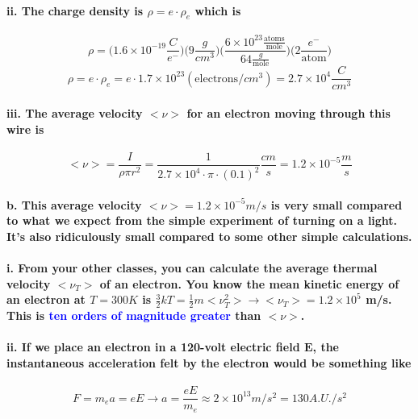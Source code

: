 \documentclass{article}
\begin{document}
\paragraph{\indent\indent ii. The charge density is $\rho=e\cdot\rho_e$ which is}
\begin{equation*}
    \rho=\bigg(1.6\times10^{-19}\frac{C}{e^-}\bigg)\bigg(9\frac{g}{cm^3}\bigg)\bigg(\frac{6\times10^{23}\frac{\text{atoms}}{\text{mole}}}{64\frac{g}{\text{mole}}}\bigg)\bigg(2\frac{e^-}{\text{atom}}\bigg)
\end{equation*}
\begin{equation*}
    \rho=e\cdot\rho_e=e\cdot 1.7\times 10^{23}(\text{electrons/}cm^3)=2.7\times10^4 \frac{C}{cm^3}
\end{equation*}
\paragraph{\indent\indent iii. The average velocity $<\nu>$ for an electron moving through this wire is}
\begin{equation}
    <\nu>=\frac{I}{\rho\pi r^2}=\frac{1}{2.7\times10^4\cdot\pi\cdot (0.1)^2}\frac{cm}{s}=1.2\times10^{-5}\frac{m}{s}
\end{equation}
\paragraph{\indent b. This average velocity $<\nu>=1.2\times10^{-5}m/s$ is very small compared to what we expect from the simple experiment of turning on a light. It's also ridiculously small compared to some other simple calculations.}
\paragraph{\indent\indent i. From your other classes, you can calculate the average thermal velocity $<\nu_T>$ of an electron. You know the mean kinetic energy of an electron at $T=300 K$ is $\frac{3}{2}kT=\frac{1}{2}m<\nu_{T}^{2}>\rightarrow<\nu_T>=1.2\times10^5$ m/s. This is \textcolor{blue}{ten orders of magnitude greater} than $<\nu>$.}
\paragraph{\indent\indent ii. If we place an electron in a 120-volt electric field $\boldsymbol{E}$, the instantaneous acceleration felt by the electron would be something like}
\begin{equation*}
    F=m_ea=eE\rightarrow a=\frac{eE}{m_e}\approx 2\times10^{13}m/s^2=130A.U./s^2
\end{equation*}
\end{document}
